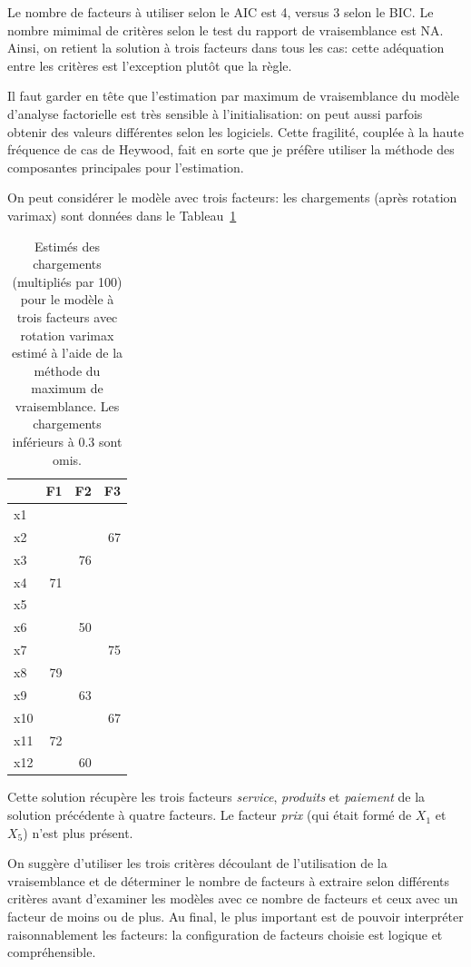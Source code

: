 \documentclass[
  11pt,
  letterpaper,
]{book}
\theoremstyle{definition}
\theoremstyle{remark}
\begin{document}
Le nombre de facteurs à utiliser selon le AIC est 4, versus 3 selon le
BIC. Le nombre mimimal de critères selon le test du rapport de
vraisemblance est NA. Ainsi, on retient la solution à trois facteurs
dans tous les cas: cette adéquation entre les critères est l'exception
plutôt que la règle.

Il faut garder en tête que l'estimation par maximum de vraisemblance du
modèle d'analyse factorielle est très sensible à l'initialisation: on
peut aussi parfois obtenir des valeurs différentes selon les logiciels.
Cette fragilité, couplée à la haute fréquence de cas de Heywood, fait en
sorte que je préfère utiliser la méthode des composantes principales
pour l'estimation.

On peut considérer le modèle avec trois facteurs: les chargements (après
rotation varimax) sont données dans le Tableau~\ref{tbl-factanal3}

\hypertarget{tbl-factanal3}{}
\begin{table}
\caption{\label{tbl-factanal3}Estimés des chargements (multipliés par 100) pour le modèle à trois
facteurs avec rotation varimax estimé à l'aide de la méthode du maximum
de vraisemblance. Les chargements inférieurs à 0.3 sont omis. }\tabularnewline

\centering
\begin{tabular}{lrrr}
\toprule
  & F1 & F2 & F3\\
\midrule
x1 &  &  & \\
x2 &  &  & 67\\
x3 &  & 76 & \\
x4 & 71 &  & \\
x5 &  &  & \\
\addlinespace
x6 &  & 50 & \\
x7 &  &  & 75\\
x8 & 79 &  & \\
x9 &  & 63 & \\
x10 &  &  & 67\\
\addlinespace
x11 & 72 &  & \\
x12 &  & 60 & \\
\bottomrule
\end{tabular}
\end{table}

Cette solution récupère les trois facteurs \emph{service},
\emph{produits} et \emph{paiement} de la solution précédente à quatre
facteurs. Le facteur \emph{prix} (qui était formé de \(X_1\) et \(X_5\))
n'est plus présent.

On suggère d'utiliser les trois critères découlant de l'utilisation de
la vraisemblance et de déterminer le nombre de facteurs à extraire selon
différents critères avant d'examiner les modèles avec ce nombre de
facteurs et ceux avec un facteur de moins ou de plus. Au final, le plus
important est de pouvoir interpréter raisonnablement les facteurs: la
configuration de facteurs choisie est logique et compréhensible.
\end{document}
